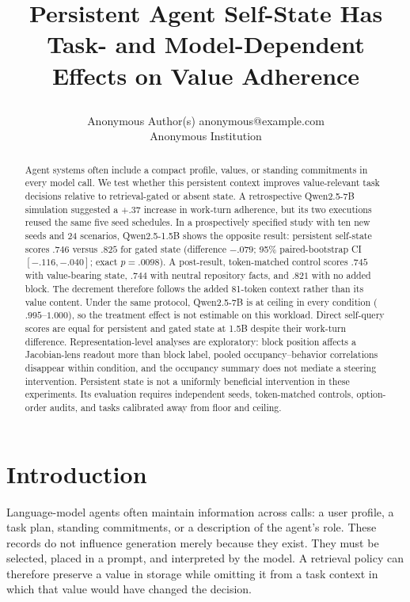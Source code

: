 \documentclass{article}
\title{\raggedright Persistent Agent Self-State Has Task- and Model-Dependent Effects on Value Adherence}
\author{\name Anonymous Author(s) \email anonymous@example.com \\
        \addr Anonymous Institution}
\begin{document}
\maketitle

\begin{abstract}
Agent systems often include a compact profile, values, or standing commitments in every model call. We test whether this persistent context improves value-relevant task decisions relative to retrieval-gated or absent state. A retrospective Qwen2.5-7B simulation suggested a $+.37$ increase in work-turn adherence, but its two executions reused the same five seed schedules. In a prospectively specified study with ten new seeds and 24 scenarios, Qwen2.5-1.5B shows the opposite result: persistent self-state scores $.746$ versus $.825$ for gated state (difference $-.079$; 95\% paired-bootstrap CI $[-.116,-.040]$; exact $p=.0098$). A post-result, token-matched control scores $.745$ with value-bearing state, $.744$ with neutral repository facts, and $.821$ with no added block. The decrement therefore follows the added 81-token context rather than its value content. Under the same protocol, Qwen2.5-7B is at ceiling in every condition ($.995$--$1.000$), so the treatment effect is not estimable on this workload. Direct self-query scores are equal for persistent and gated state at 1.5B despite their work-turn difference. Representation-level analyses are exploratory: block position affects a Jacobian-lens readout more than block label, pooled occupancy--behavior correlations disappear within condition, and the occupancy summary does not mediate a steering intervention. Persistent state is not a uniformly beneficial intervention in these experiments. Its evaluation requires independent seeds, token-matched controls, option-order audits, and tasks calibrated away from floor and ceiling.
\end{abstract}

\section{Introduction}
Language-model agents often maintain information across calls: a user profile, a task plan, standing commitments, or a description of the agent's role. These records do not influence generation merely because they exist. They must be selected, placed in a prompt, and interpreted by the model. A retrieval policy can therefore preserve a value in storage while omitting it from a task context in which that value would have changed the decision.
\end{document}
